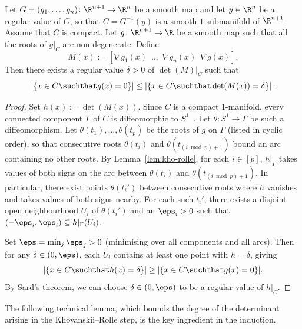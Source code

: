 \begin{corollary} \label{cor:kho-rolle} Let $G = (g_1, \ldots, g_n)\colon \R^{n+1} \rightarrow \R^{n}$ be a smooth map and let $y \in \R^n$ be a regular value of $G$, so that $C = G^{-1}(y)$ is a smooth $1$-submanifold of $\R^{n+1}$. Assume that $C$ is compact. Let $g\colon \R^{n+1} \rightarrow \R$ be a smooth map such that all the roots of $g|_C$ are non-degenerate. Define
\begin{equation*}
  M(x) := \left[\nabla g_1(x)\enspace \ldots\enspace \nabla g_n(x)\enspace \nabla g(x)\right].
\end{equation*}
Then there exists a regular value $\delta > 0$ of $\det(M)|_C$ such that
\begin{equation*}
  \left|\left\{x \in C \suchthat g(x) = 0\right\}\right| \le \left|\left\{x \in C \suchthat \det(M(x)) = \delta\right\}\right|.
\end{equation*}
\end{corollary}

\begin{proof}
Set $h(x) := \det\left(M(x)\right)$. Since $C$ is a compact $1$-manifold, every connected component $\Gamma$ of $C$ is diffeomorphic to $S^1$~\cite[Appendix]{milnor1997topology}. Let $\theta\colon S^1 \rightarrow \Gamma$ be such a diffeomorphism. Let $\theta(t_1), \ldots, \theta(t_p)$ be the roots of $g$ on $\Gamma$ (listed in cyclic order), so that consecutive roots $\theta(t_i)$ and $\theta(t_{(i\bmod p)+1})$ bound an arc containing no other roots. By Lemma~\ref{lem:kho-rolle}, for each $i\in [p]$, $h|_\Gamma$ takes values of both signs on the arc between $\theta(t_i)$ and $\theta(t_{(i\bmod p)+1})$. In particular, there exist points $\theta(t_i')$ between consecutive roots where $h$ vanishes and takes values of both signs nearby. For each such $t_i'$, there exists a disjoint open neighbourhood $U_i$ of $\theta(t_i')$ and an $\eps_i > 0$ such that $(-\eps_i, \eps_i) \subseteq h|_\Gamma(U_i)$.

Set $\eps = \min_j \eps_j > 0$ (minimising over all components and all arcs). Then for any $\delta \in (0, \eps)$, each $U_i$ contains at least one point with $h = \delta$, giving 
\begin{equation*}
  |\{x\in C \suchthat h(x) = \delta\}| \geq |\{x\in C \suchthat g(x) = 0\}|.
\end{equation*} 
By Sard's theorem, we can choose $\delta \in (0, \eps)$ to be a regular value of $h|_C$.
\end{proof}

The following technical lemma, which bounds the degree of the determinant arising in the Khovanskii--Rolle step, is the key ingredient in the induction.


